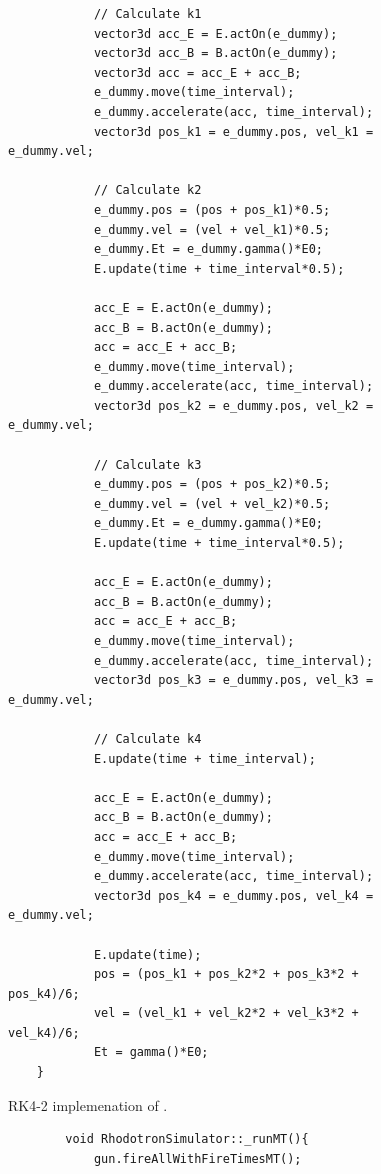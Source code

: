 \documentclass[a4paper,oneside,12pt]{report}
\numberwithin{equation}{chapter}
\begin{document}
{\begin{figure}[H]
\begin{verbatim}
            // Calculate k1
            vector3d acc_E = E.actOn(e_dummy);
            vector3d acc_B = B.actOn(e_dummy);
            vector3d acc = acc_E + acc_B;
            e_dummy.move(time_interval);
            e_dummy.accelerate(acc, time_interval);
            vector3d pos_k1 = e_dummy.pos, vel_k1 = e_dummy.vel;
    
            // Calculate k2
            e_dummy.pos = (pos + pos_k1)*0.5;
            e_dummy.vel = (vel + vel_k1)*0.5;
            e_dummy.Et = e_dummy.gamma()*E0;
            E.update(time + time_interval*0.5);
    
            acc_E = E.actOn(e_dummy);
            acc_B = B.actOn(e_dummy);
            acc = acc_E + acc_B;
            e_dummy.move(time_interval);
            e_dummy.accelerate(acc, time_interval);
            vector3d pos_k2 = e_dummy.pos, vel_k2 = e_dummy.vel;
    
            // Calculate k3
            e_dummy.pos = (pos + pos_k2)*0.5;
            e_dummy.vel = (vel + vel_k2)*0.5;
            e_dummy.Et = e_dummy.gamma()*E0;
            E.update(time + time_interval*0.5);

            acc_E = E.actOn(e_dummy);
            acc_B = B.actOn(e_dummy);
            acc = acc_E + acc_B;
            e_dummy.move(time_interval);
            e_dummy.accelerate(acc, time_interval);
            vector3d pos_k3 = e_dummy.pos, vel_k3 = e_dummy.vel;
    
            // Calculate k4
            E.update(time + time_interval);

            acc_E = E.actOn(e_dummy);
            acc_B = B.actOn(e_dummy);
            acc = acc_E + acc_B;
            e_dummy.move(time_interval);
            e_dummy.accelerate(acc, time_interval);
            vector3d pos_k4 = e_dummy.pos, vel_k4 = e_dummy.vel;
    
            E.update(time);
            pos = (pos_k1 + pos_k2*2 + pos_k3*2 + pos_k4)/6;
            vel = (vel_k1 + vel_k2*2 + vel_k3*2 + vel_k4)/6;
            Et = gamma()*E0;
    }
    \end{verbatim}
    \vspace{20pt}
\caption{RK4-2 implemenation of \eEM.}
\label{fig:rk2_EM}
\end{figure}

\begin{figure}[H]
    \centering
    \begin{verbatim}
        void RhodotronSimulator::_runMT(){
            gun.fireAllWithFireTimesMT();
        

\end{verbatim}
\end{figure}}
\end{document}
